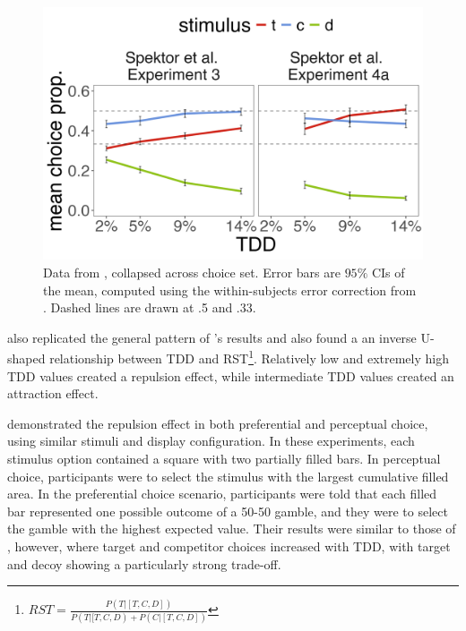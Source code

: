 \documentclass{umassthesis}          %
\begin{document}
\begin{figure}
   \includegraphics[width=\linewidth]{figures/spektor_data_collapsed.jpeg}
   \caption{Data from \textcite{spektorWhenGoodLooks2018b}, collapsed across choice set. Error bars are $95\%$ CIs of the mean, computed using the within-subjects error correction from \textcite{morey2008confidence}. Dashed lines are drawn at .5 and .33.}
   \label{fig:spektor_data} %
\end{figure}

\textcite{liaoInfluenceDistanceDecoy2021} also replicated the general pattern of \textcite{spektorWhenGoodLooks2018b}'s results and also found a an inverse U-shaped relationship between TDD and RST\footnote{$RST=\frac{P(T|[T,C,D])}{P(T|[T,C,D)+P(C|[T,C,D])}$}. Relatively low and extremely high TDD values created a repulsion effect, while intermediate TDD values created an attraction effect. 

\textcite{spektorRepulsionEffectPreferential2022} demonstrated the repulsion effect in both preferential and perceptual choice, using similar stimuli and display configuration. In these experiments, each stimulus option contained a square with two partially filled bars. In perceptual choice, participants were to select the stimulus with the largest cumulative filled area. In the preferential choice scenario, participants were told that each filled bar represented one possible outcome of a 50-50 gamble, and they were to select the gamble with the highest expected value. Their results were similar to those of \textcite{spektorWhenGoodLooks2018b}, however, where target and competitor choices increased with TDD, with target and decoy showing a particularly strong trade-off.
\end{document}
